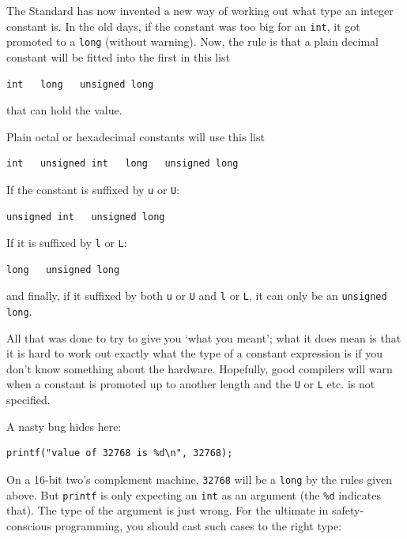    The Standard has now invented a new way of working out what type an
    integer constant is. In the old days, if the constant was too big for an
    \texttt{int}, it got promoted to a \texttt{long} (without
    warning). Now, the rule is that a plain decimal constant will be fitted
    into the first in this list


   \begin{Verbatim}
int   long   unsigned long
\end{Verbatim}

   that can hold the value.


   Plain octal or hexadecimal constants will use this list


   \begin{Verbatim}
int   unsigned int   long   unsigned long
\end{Verbatim}

   If the constant is suffixed by \texttt{u}
    or \texttt{U}:


   \begin{Verbatim}
unsigned int   unsigned long
\end{Verbatim}

   If it is suffixed by \texttt{l} or \texttt{L}:


   \begin{Verbatim}
long   unsigned long
\end{Verbatim}

   and finally, if it suffixed by both \texttt{u}
    or \texttt{U} and \texttt{l} or \texttt{L}, it
    can only be an \texttt{unsigned long}.


   All that was done to try to give you `what you meant'; what it
    does mean is that it is hard to work out exactly what the type of a
    constant expression is if you don't know something about the hardware.
    Hopefully, good compilers will warn when a constant is promoted up to
    another length and the \texttt{U} or \texttt{L} etc. is
    not specified.


   A nasty bug hides here:


   \begin{Verbatim}
printf("value of 32768 is %d\n", 32768);
\end{Verbatim}

   On a 16-bit two's complement machine, \texttt{32768} will be a
    \texttt{long} by the rules given above. But \texttt{printf} is
    only expecting an \texttt{int} as an argument
    (the \texttt{\%d} indicates that). The type of the argument is
    just wrong. For the ultimate in safety-conscious programming, you should
    cast such cases to the right type:


